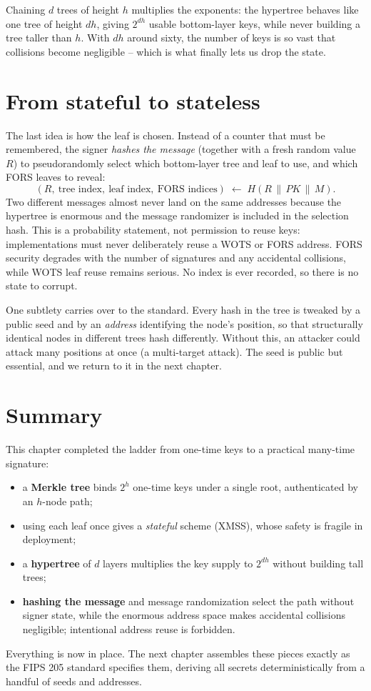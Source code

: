 Chaining $d$ trees of height $h$ multiplies the exponents: the hypertree behaves like one tree of height $dh$, giving $2^{dh}$ usable bottom-layer keys, while never building a tree taller than $h$. With $dh$ around sixty, the number of keys is so vast that collisions become negligible -- which is what finally lets us drop the state.

\section{From stateful to stateless}
The last idea is how the leaf is chosen. Instead of a counter that must be remembered, the signer \emph{hashes the message} (together with a fresh random value $R$) to pseudorandomly select which bottom-layer tree and leaf to use, and which FORS leaves to reveal:
\[
(R,\ \text{tree index},\ \text{leaf index},\ \text{FORS indices}) \;\longleftarrow\; H(R \,\|\, PK \,\|\, M).
\]
Two different messages almost never land on the same addresses because the hypertree is enormous and the message randomizer is included in the selection hash. This is a probability statement, not permission to reuse keys: implementations must never deliberately reuse a WOTS or FORS address. FORS security degrades with the number of signatures and any accidental collisions, while WOTS leaf reuse remains serious. No index is ever recorded, so there is no state to corrupt.

\begin{remark}
One subtlety carries over to the standard. Every hash in the tree is tweaked by a public seed and by an \emph{address} identifying the node's position, so that structurally identical nodes in different trees hash differently. Without this, an attacker could attack many positions at once (a multi-target attack). The seed is public but essential, and we return to it in the next chapter.
\end{remark}

\section{Summary}
This chapter completed the ladder from one-time keys to a practical many-time signature:

\begin{itemize}
  \item a \textbf{Merkle tree} binds $2^h$ one-time keys under a single root, authenticated by an $h$-node path;
  \item using each leaf once gives a \emph{stateful} scheme (XMSS), whose safety is fragile in deployment;
  \item a \textbf{hypertree} of $d$ layers multiplies the key supply to $2^{dh}$ without building tall trees;
  \item \textbf{hashing the message} and message randomization select the path without signer state, while the enormous address space makes accidental collisions negligible; intentional address reuse is forbidden.
\end{itemize}

Everything is now in place. The next chapter assembles these pieces exactly as the FIPS 205 standard specifies them, deriving all secrets deterministically from a handful of seeds and addresses.

\printbibliography[heading=chapterrefs]
